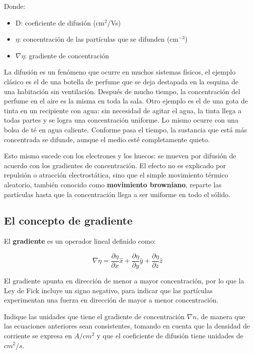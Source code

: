 Donde: 

\begin{itemize}
    \item D: coeficiente de difusión (cm$^2$/Vs)
    \item $\eta$: concentración de las partículas que se difunden (cm$^{-3}$)
    \item $\nabla \eta$: gradiente de concentración
\end{itemize}

La difusión es un fenómeno que ocurre en muchos sistemas físicos, el ejemplo clásico es el de una botella de perfume que se deja destapada en la esquina de una habitación sin ventilación. Después de mucho tiempo, la concentración del perfume en el aire es la misma en toda la sala. Otro ejemplo es el de una gota de tinta en un recipiente con agua: sin necesidad de agitar el agua, la tinta llega a todas partes y se logra una concentración uniforme. Lo mismo ocurre con una bolsa de té en agua caliente. Conforme pasa el tiempo, la sustancia que está más concentrada se difunde, aunque el medio esté completamente quieto.

Esto mismo sucede con los electrones y los huecos: se mueven por difusión de acuerdo con los gradientes de concentración. El efecto no es explicado por repulsión o atracción electrostática, sino que el simple movimiento térmico aleatorio, también conocido como \textbf{movimiento browniano}, reparte las partículas hasta que la concentración llega a ser uniforme en todo el sólido.

\subsection{El concepto de gradiente}

El \textbf{gradiente} es un operador lineal definido como:

\[ \nabla \eta = \dfrac{\partial \eta}{\partial x} \hat{x} + \dfrac{\partial \eta}{\partial y} \hat{y} + \dfrac{\partial \eta}{\partial z} \hat{z} \]

El gradiente apunta en dirección de menor a mayor concentración, por lo que la Ley de Fick incluye un signo negativo, para indicar que las partículas experimentan una fuerza en dirección de mayor a menor concentración.

\begin{ejemplo}
Indique las unidades que tiene el gradiente de concentración $\nabla n$, de manera que las ecuaciones anteriores sean consistentes, tomando en cuenta que la densidad de corriente se expresa en $A/cm^{2}$ y que el coeficiente de difusión tiene unidades de $cm^2/s$.
\end{ejemplo}





